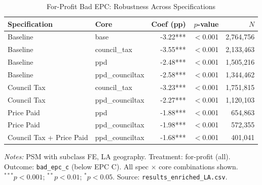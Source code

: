 \begin{table}[htbp]
\centering
\caption{For-Profit Bad EPC: Robustness Across Specifications}
\label{tab:h2_bad_epc_robust}
\begin{tabular}{llrrr}
\toprule
Specification & Core & Coef (pp) & $p$-value & $N$ \\
\midrule
Baseline & base & -3.22*** & $<$0.001 & 2,764,756 \\
Baseline & council\_tax & -3.55*** & $<$0.001 & 2,133,463 \\
Baseline & ppd & -2.48*** & $<$0.001 & 1,505,216 \\
Baseline & ppd\_counciltax & -2.58*** & $<$0.001 & 1,344,462 \\
Council Tax & council\_tax & -3.23*** & $<$0.001 & 1,751,815 \\
Council Tax & ppd\_counciltax & -2.27*** & $<$0.001 & 1,120,103 \\
Price Paid & ppd & -1.88*** & $<$0.001 & 654,863 \\
Price Paid & ppd\_counciltax & -1.98*** & $<$0.001 & 572,355 \\
Council Tax + Price Paid & ppd\_counciltax & -1.68*** & $<$0.001 & 401,041 \\
\bottomrule
\end{tabular}
\begin{minipage}{0.9\textwidth}
\vspace{4pt}
\footnotesize
\textit{Notes:} PSM with subclass FE, LA geography.
Treatment: for-profit (all). Outcome: \texttt{bad\_epc\_c} (below EPC C).
All spec $\times$ core combinations shown.
$^{***}p<0.001$; $^{**}p<0.01$; $^{*}p<0.05$.
Source: \texttt{results\_enriched\_LA.csv}.
\end{minipage}
\end{table}
